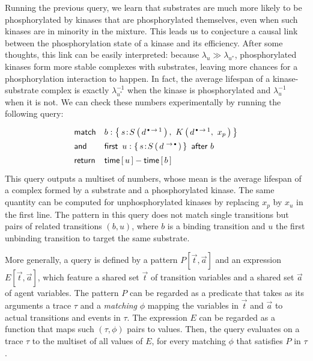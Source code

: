 \documentclass[runningheads]{llncs}
\begin{document}
Running the previous query, we learn that substrates are much more
likely to be phosphorylated by kinases that are phosphorylated
themselves, even when such kinases are in minority in the mixture.
This leads us to conjecture a causal link between the phosphorylation
state of a kinase and its efficiency. After some thoughts, this link
can be easily interpreted: because $\lambda_u \gg \lambda_{u^*}$,
phosphorylated kinases form more stable complexes with substrates,
leaving more chances for a phosphorylation interaction to happen.  In
fact, the average lifespan of a kinase-substrate complex is exactly
$\lambda_{u^*}^{-1}$ when the kinase is phosphorylated and
$\lambda_u^{-1}$ when it is not. We can check these numbers
experimentally by running the following query:
\begin{equation}\label{eq:query-lifespan}
  \Query{
    \m{match} & 
    b:\Set{ \iAG{s}{S}{d^{\Trans{\Free}{1}}}, \ 
      \AG{K}{d^{\Trans{\Free}{1}}, \ x_{p}} } \\
    \m{and} &
    \FirstAfter{u:\Set{ \iAG{s}{S}{d^{\Trans{}{\Free}}} }}{b} \\
    \m{return} & 
    \Time{u} - \Time{b}
  }
\end{equation}
This query outputs a multiset of numbers, whose mean is the average
lifespan of a complex formed by a substrate and a phosphorylated
kinase. The same quantity can be computed for unphosphorylated kinases
by replacing $x_p$ by $x_u$ in the first
line. %
The pattern in this query does not match single transitions but pairs
of related transitions $(b, u)$, where $b$ is a binding transition and
$u$ the first unbinding transition to target the same substrate.

\iffalse
\begin{equation}\label{eq:query-kinase-efficiency}
  \Query{
    \m{match} & 
    b:\Set{ \iAG{s}{S}{x_u,\ d^{\Trans{\Free}{1}}}, \ 
      \iAG{k}{K}{d^{\Trans{\Free}{1}}} } \\
    \m{and} &
    \FirstAfter{u:\Set{ \iAG{s}{S}{d^{\Trans{}{\Free}}} }}{b} \\
    \m{return} & 
      \IntState{\StateBefore{b}}{k}{\STR{x}}, \ 
      \IntState{\StateAfter{u}}{s}{\STR{x}}
  }
\end{equation}
\fi

\bigskip

More generally, a query is defined by a {pattern}
$P[\Vec{t}, \Vec{a}]$ and an {expression} $E[\Vec{t}, \Vec{a}]$, which
feature a shared set $\Vec{t}$ of transition variables and a shared
set $\Vec{a}$ of agent variables. The pattern $P$ can be regarded as a
predicate that takes as its arguments a trace $\tau$ and a
\emph{matching} $\phi$ mapping the variables in $\Vec{t}$ and
$\Vec{a}$ to actual transitions and events in $\tau$.  The expression
$E$ can be regarded as a function that maps such $(\tau, \phi)$ pairs
to values. Then, the query evaluates on a trace $\tau$ to the multiset
of all values of $E$, for every matching $\phi$ that satisfies $P$ in
$\tau$.
\end{document}
